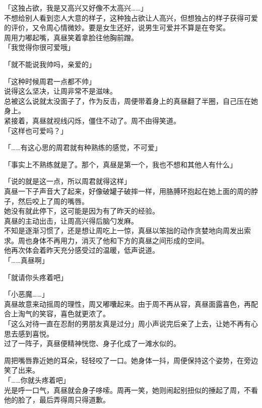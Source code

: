 「这独占欲，我是又高兴又好像不太高兴……」\\

不想给别人看到恋人大意的样子，这种独占欲让人高兴，但想独占的样子获得可爱的评价，又令周心情微妙。要是女生还好，说男生可爱并不算是在夸奖。\\

周用力嘟起嘴，真昼笑着拿脸往他胸前蹭。\\

「我觉得你很可爱哦」

「就不能说我帅吗，亲爱的」

「这种时候周君一点都不帅」\\

说得这么坚决，让周非常不是滋味。\\

总被这么说就太没面子了，作为反击，周便带着身上的真昼翻了半圈，自己压在她身上。\\

紧接着，真昼就视线闪烁，僵住不动了。周不由得笑道。\\

「这样也可爱吗？」

「……有这心思的周君就有种熟练的感觉，不可爱」

「事实上不熟练就是了。那个，真昼是第一个，我也不想和其他人有什么」

「说的就是这一点，所以周君就得这样」\\

真昼一下子声音大了起来，好像破罐子破摔一样，用胳膊环抱起在她上面的周的脖子，然后咬上了周的嘴唇。\\

她没有就此停下，这可能是因为有了昨天的经验。\\

真昼的主动出击，让周高兴得后脑勺发麻。\\

不知是逐渐习惯了，还是想让周吃上一惊，真昼以笨拙的动作贪婪地向周发出索求。周也身体不再用力，消灭了他和下方的真昼之间形成的空间。\\

他再次体会着昨天充分感受过的温暖，低声说道。\\

「……真昼啊」

「就请你头疼着吧」

「小恶魔……」\\

真昼故意来动摇周的理性，周又嘟囔起来。由于周不再从容，真昼面露喜色，再配合上淘气的笑容，喜色就更浓了。\\

「这么对待一直在忍耐的男朋友真是过分」周小声说完后亲了上去，让她不再有心思去感到喜悦。\\

过了一阵子，真昼便精神恍惚、身子化成了一滩水似的。

周把嘴唇靠近她的耳朵，轻轻咬了一口。她身体一抖，周便保持这个姿势，在旁边笑了出来。\\

「……你就头疼着吧」\\

光是呼一口气，真昼就会身子哆嗦。周再一笑，她则闹起别扭似的捶起了周，不看他的脸了，最后弄得周只得道歉。
